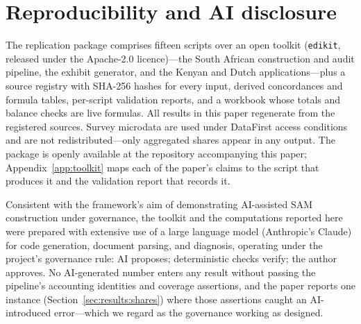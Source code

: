 \section*{Reproducibility and AI disclosure}\label{sec:disclosure}

The replication package comprises fifteen scripts over an open toolkit
(\texttt{edikit}, released under the Apache-2.0 licence)---the South
African construction and audit pipeline, the exhibit generator, and the
Kenyan and Dutch applications---plus a source registry with SHA-256 hashes
for every input, derived concordances and formula tables, per-script
validation reports, and a workbook whose totals and balance checks are
live formulas. All results in this paper regenerate from
the registered sources. Survey microdata are used under DataFirst access
conditions and are not redistributed---only aggregated shares appear in any
output. The package is openly available at the repository accompanying
this paper; Appendix~\ref{app:toolkit} maps each of the paper's claims
to the script that produces it and the validation report that records
it.

Consistent with the framework's aim of demonstrating AI-assisted SAM
construction under governance, the toolkit and the computations reported
here were prepared with extensive use of a large language model
(Anthropic's Claude) for code generation, document parsing, and
diagnosis, operating under the project's governance rule: AI proposes;
deterministic checks verify; the author approves. No AI-generated number
enters any result without passing the pipeline's accounting identities and
coverage assertions, and the paper reports one instance
(Section~\ref{sec:results:shares}) where those assertions caught an
AI-introduced error---which we regard as the governance working as
designed.
